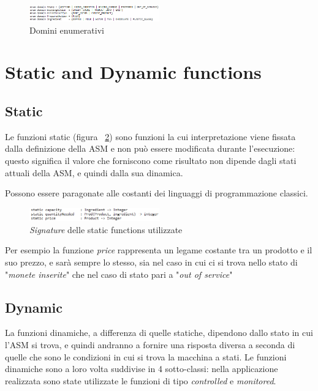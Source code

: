 \begin{figure}[h]
	\centering
	\includegraphics[width=0.5\textwidth]{Immagini/EnumDomain.png}
	\caption{Domini enumerativi}
	\label{fig:enumDomain}
\end{figure}

\newpage
\section{Static and Dynamic functions}
\subsection{Static}
Le funzioni static (figura ~\ref{fig:staticFunc}) sono funzioni la cui interpretazione viene fissata dalla definizione della ASM e non può essere modificata durante l’esecuzione: questo significa il valore che forniscono come risultato non dipende dagli stati attuali della ASM, e quindi dalla sua dinamica.

Possono essere paragonate alle costanti dei linguaggi di programmazione classici.
\begin{figure}[h]
	\centering
	\includegraphics[width=0.5\textwidth]{Immagini/StaticFunction.png}
	\caption{\textit{Signature} delle static functions utilizzate}
	\label{fig:staticFunc}
\end{figure}

Per esempio la funzione \textit{price} rappresenta un legame costante tra un prodotto e il suo prezzo, e sarà sempre lo stesso, sia nel caso in cui ci si trova nello stato di "\textit{monete inserite}" che nel caso di stato pari a "\textit{out of service}"

\subsection{Dynamic}
La funzioni dinamiche, a differenza di quelle statiche, dipendono dallo stato in cui l'ASM si trova, e quindi andranno a fornire una risposta diversa a seconda di quelle che sono le condizioni in cui si trova la macchina a stati.
Le funzioni dinamiche sono a loro volta suddivise in 4 sotto-classi: nella applicazione realizzata sono state utilizzate le funzioni di tipo \textit{controlled} e \textit{monitored}.

